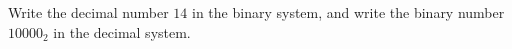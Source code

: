 Write the decimal number $14$ in the binary system, and write the binary number $10000_2$ in the decimal system.
